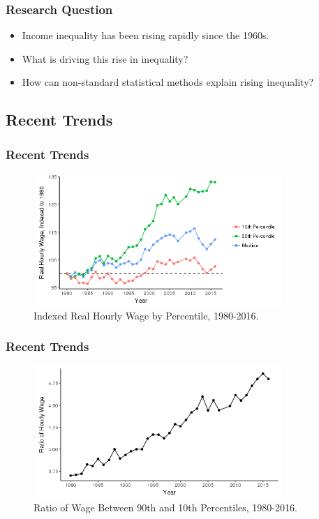 \documentclass{beamer}
\begin{document}

\begin{frame}
\frametitle{Research Question}
\begin{itemize} 
\item Income inequality has been rising rapidly since the 1960s.
\item What is driving this rise in inequality? 
\item How can non-standard statistical methods explain rising inequality?
\end{itemize}
\end{frame}

\subsection{Recent Trends}
\begin{frame}
\frametitle{Recent Trends}
\pause
\begin{figure}
  \centering
  \caption{Indexed Real Hourly Wage by Percentile, 1980-2016.}
  \includegraphics[width=9.5cm, height=5cm]{Ineq_graph.png}
\end{figure}
\end{frame}

\begin{frame}
\frametitle{Recent Trends}
\pause
\begin{figure}[H]
  \centering
  \caption{Ratio of Wage Between 90th and 10th Percentiles, 1980-2016.}
  \includegraphics[width=9.5cm, height=5cm]{Ratio_plot1.png}
\end{figure} 
\end{frame}
\end{document}
